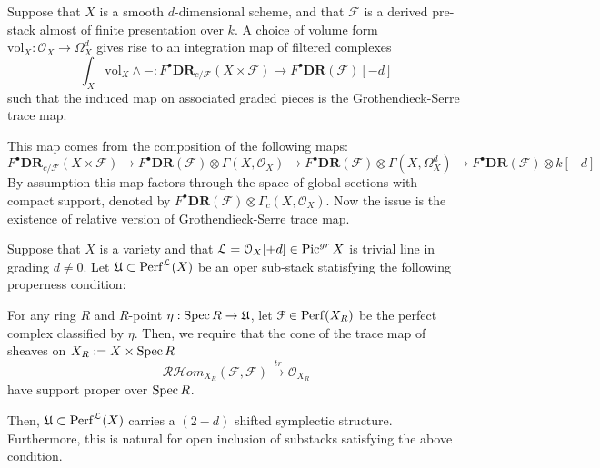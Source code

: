 \begin{thm}\label{intalongfiber}
    Suppose that $X$ is a smooth $d$-dimensional scheme, and that $\mathcal{F}$ is a derived pre-stack almost of finite presentation over $k$. A choice of volume form $\text{vol}_X: \mathcal{O}_X \to \Omega^d_X$ gives rise to an integration map of filtered complexes
    \begin{equation*}
        \int_{X}\text{vol}_X \wedge-:F^{\bullet}\textbf{DR}_{c/\mathcal{F}}(X \times \mathcal{F}) \to F^{\bullet}\textbf{DR}(\mathcal{F})[-d]
    \end{equation*}
    such that the induced map on associated graded pieces is the Grothendieck-Serre trace map.
\end{thm}
This map comes from the composition of the following maps:
\begin{equation*}
    F^{\bullet}\textbf{DR}_{c/\mathcal{F}}(X \times \mathcal{F}) \to F^{\bullet}\textbf{DR}(\mathcal{F}) \otimes \Gamma(X,\mathcal{O}_X) \to F^{\bullet}\textbf{DR}(\mathcal{F}) \otimes \Gamma(X, \Omega^d_X) \to F^{\bullet}\textbf{DR}(\mathcal{F}) \otimes k[-d]
\end{equation*}
By assumption this map factors through the space of global sections with compact support, denoted by $F^{\bullet}\textbf{DR}(\mathcal{F}) \otimes \Gamma_c(X, \mathcal{O}_X)$. Now the issue is the existence of relative version of Grothendieck-Serre trace map. 
\begin{thm}\label{mainthm}
    Suppose that $X$ is a variety and that $\mathcal{L}=\mathcal{O}_X[+d] \in \operatorname{Pic}^{gr}X$ is trivial line in grading $d \neq 0$. Let $\mathfrak{U} \subset \mathrm{Perf}^{\mathcal{L}}(X)$ be an oper sub-stack statisfying the following properness condition:
    \begin{center}
    For any ring $R$ and $R$-point $\eta: \operatorname{Spec} R \to \mathfrak{U}$, let $\mathcal{F} \in \mathrm{Perf}(X_R)$ be the perfect complex classified by $\eta$. Then, we require that the cone of the trace map of sheaves on $X_R:=X \times \operatorname{Spec} R$
    \begin{equation*}
        \mathcal{RH}om_{X_R}(\mathcal{F}, \mathcal{F}) \xrightarrow{tr} \mathcal{O}_{X_R}
    \end{equation*}
    have support proper over $\operatorname{Spec} R$. 
    \end{center}
    Then, $\mathfrak{U} \subset \mathrm{Perf}^{\mathcal{L}}(X)$ carries a $(2-d)$ shifted symplectic structure. Furthermore, this is natural for open inclusion of substacks satisfying the above condition.
\end{thm}
